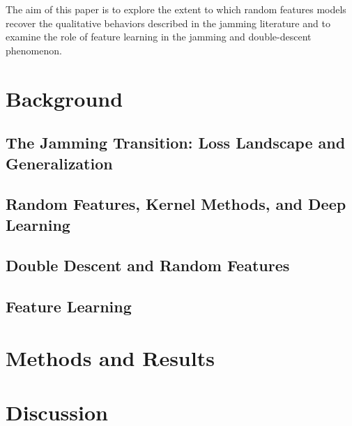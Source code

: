 \documentclass[a4paper, 12pt, titlepage]{article}
\begin{document}
The aim of this paper is to explore the extent to which random features models recover the qualitative behaviors described in the jamming literature and to examine the role of feature learning in the jamming and double-descent phenomenon. 

\section{Background}

\subsection{The Jamming Transition: Loss Landscape and Generalization}
\subsection{Random Features, Kernel Methods, and Deep Learning}
\subsection{Double Descent and Random Features}
\subsection{Feature Learning}

\section{Methods and Results}
\section{Discussion}

\printbibliography
\end{document}
